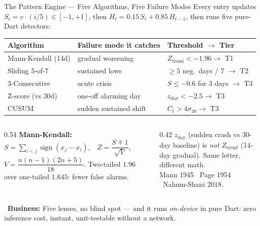 \documentclass[aspectratio=169,11pt]{beamer}
\providecommand{\faChartPie}{}
\newcommand{\biz}[1]{\vspace{0.3em}\par{\footnotesize\color{moodorange}\faChartPie\ \textbf{Business:} #1}}
\begin{document}
\begin{frame}{The Pattern Engine --- Five Algorithms, Five Failure Modes}
{\footnotesize Every entry updates $S_t = v\cdot(i/5)\in[-1,+1]$, then $H_t = 0.15\,S_t + 0.85\,H_{t-1}$, then runs five pure-Dart detectors:}
\vspace{0.2em}
\begin{center}\scriptsize
\begin{tabular}{@{}lll@{}}
\toprule
\textbf{Algorithm} & \textbf{Failure mode it catches} & \textbf{Threshold $\to$ Tier} \\
\midrule
Mann-Kendall (14d) & gradual worsening & $Z_{\text{trend}} < -1.96 \to$ T1 \\
Sliding 5-of-7 & sustained lows & $\geq 5$ neg.\ days / 7 $\to$ T2 \\
3-Consecutive & acute crisis & $S \leq -0.6$ for 3 days $\to$ T3 \\
Z-score (vs 30d) & one-off alarming day & $z_{\text{day}} < -2.5 \to$ T3 \\
CUSUM & sudden sustained shift & $C_t > 4\sigma_{30} \to$ T3 \\
\bottomrule
\end{tabular}
\end{center}
\vspace{0.2em}
\begin{columns}[T,onlytextwidth]
  \begin{column}{0.54\textwidth}
    {\footnotesize\textbf{Mann-Kendall:} $S=\sum_{i<j}\operatorname{sign}(x_j-x_i)$,\ \ $Z=\dfrac{S\mp 1}{\sqrt{V}}$,\ \ $V=\dfrac{n(n{-}1)(2n{+}5)}{18}$. Two-tailed $1.96$ over one-tailed $1.645$: fewer false alarms.}
  \end{column}
  \begin{column}{0.42\textwidth}
    {\footnotesize $z_{\text{day}}$ (sudden crash vs 30-day baseline) is \emph{not} $Z_{\text{trend}}$ (14-day gradual). Same letter, different math.\\ {\scriptsize Mann 1945 \textperiodcentered\ Page 1954 \textperiodcentered\ Nahum-Shani 2018.}}
  \end{column}
\end{columns}
\biz{Five lenses, no blind spot --- and it runs \emph{on-device} in pure Dart: zero inference cost, instant, unit-testable without a network.}
\end{frame}
\end{document}
